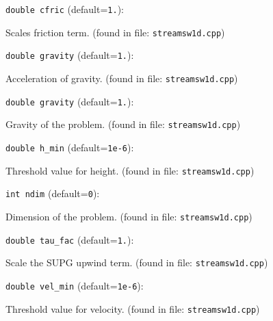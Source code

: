 \item\verb+double cfric+ {\rm(default=\verb|1.|)}:

Scales friction term.
 (found in file: \verb+streamsw1d.cpp+)
\item\verb+double gravity+ {\rm(default=\verb|1.|)}:

Acceleration of gravity.
 (found in file: \verb+streamsw1d.cpp+)
\item\verb+double gravity+ {\rm(default=\verb|1.|)}:

Gravity of the problem.
 (found in file: \verb+streamsw1d.cpp+)
\item\verb+double h_min+ {\rm(default=\verb|1e-6|)}:

Threshold value for height.
 (found in file: \verb+streamsw1d.cpp+)
\item\verb+int ndim+ {\rm(default=\verb|0|)}:

Dimension of the problem. 
 (found in file: \verb+streamsw1d.cpp+)
\item\verb+double tau_fac+ {\rm(default=\verb|1.|)}:

Scale the SUPG upwind term. 
 (found in file: \verb+streamsw1d.cpp+)
\item\verb+double vel_min+ {\rm(default=\verb|1e-6|)}:

Threshold value for velocity.
 (found in file: \verb+streamsw1d.cpp+)
